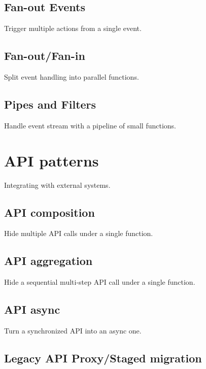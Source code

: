 \subsection{Fan-out Events} \label{subsec:FanoutEvents}

Trigger multiple actions from a single event.

\subsection{Fan-out/Fan-in} \label{subsec:FanoutFanin}

Split event handling into parallel functions.

\subsection{Pipes and Filters} \label{subsec:PipesAndFilters}

Handle event stream with a pipeline of small functions.

\section{API patterns} \label{sec:apiPatterns}

Integrating with external systems.

\subsection{API composition} \label{subsec:apiComposition}

Hide multiple API calls under a single function.

\subsection{API aggregation} \label{subsec:apiAggregation}

Hide a sequential multi-step API call under a single function.

\subsection{API async} \label{subsec:apiAsync}

Turn a synchronized API into an async one.

\subsection{Legacy API Proxy/Staged migration} \label{subsec:legacyApi}

